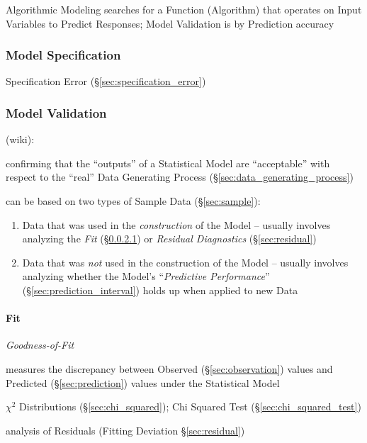 Algorithmic Modeling searches for a Function (Algorithm) that operates on Input
Variables to Predict Responses; Model Validation is by Prediction accuracy



\subsubsection{Model Specification}\label{sec:model_specification}

\fist Specification Error (\S\ref{sec:specification_error})



\subsubsection{Model Validation}\label{sec:model_validation}

(wiki):

confirming that the ``outputs'' of a Statistical Model are ``acceptable'' with
respect to the ``real'' Data Generating Process
(\S\ref{sec:data_generating_process})

can be based on two types of Sample Data (\S\ref{sec:sample}):
\begin{enumerate}
  \item Data that was used in the \emph{construction} of the Model -- usually
    involves analyzing the \emph{Fit} (\S\ref{sec:model_fit}) or \emph{Residual
      Diagnostics} (\S\ref{sec:residual})
  \item Data that was \emph{not} used in the construction of the Model --
    usually involves analyzing whether the Model's ``\emph{Predictive
      Performance}'' (\S\ref{sec:prediction_interval}) holds up when applied to
    new Data
\end{enumerate}



\paragraph{Fit}\label{sec:model_fit}\hfill

\emph{Goodness-of-Fit}

measures the discrepancy between Observed (\S\ref{sec:observation}) values and
Predicted (\S\ref{sec:prediction}) values under the Statistical Model

$\chi^2$ Distributions (\S\ref{sec:chi_squared});
Chi Squared Test (\S\ref{sec:chi_squared_test})

\fist analysis of Residuals (Fitting Deviation \S\ref{sec:residual})

